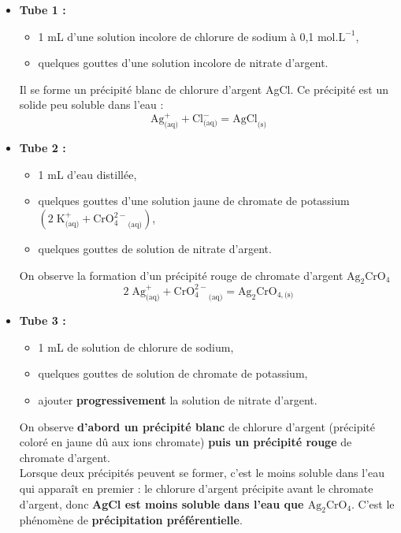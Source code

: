 \documentclass[11pt,a4paper]{report}
\begin{document}
\begin{itemize}
	\item \textbf{Tube 1 :}
		\begin{itemize}
			\item 1 mL d'une solution incolore de chlorure de sodium à 0,1 mol.$\text{L}^{-1}$,
			\item quelques gouttes d'une solution incolore de nitrate d'argent.
		\end{itemize}		 
		Il se forme un précipité blanc de chlorure d'argent AgCl. Ce précipité est un solide peu 				soluble dans l'eau :
		\begin{equation}
			\boxed{\text{Ag}^+_\text{(aq)} + \text{Cl}^-_\text{(aq)} = \text{AgCl}_\text{(s)}}
		\end{equation}
		
	\item \textbf{Tube 2 :}
		\begin{itemize}
			\item 1 mL d’eau distillée,
			\item quelques gouttes d'une solution jaune de 
			chromate de potassium $(2\;\text{K}^+_\text{(aq)}+{\text{CrO}_4^{2-}}_\text{(aq)})$,
			\item quelques gouttes de solution de nitrate d'argent.	
		\end{itemize}
		On observe la formation d'un précipité rouge de chromate d'argent $\text{Ag}_2\text{CrO}_4$
		\begin{equation}
			\boxed{2\;\text{Ag}^+_\text{(aq)} + {\text{CrO}_4^{2-}}_\text{(aq)} 
			= \text{Ag}_2\text{CrO}_{4,\text{(s)}}}
		\end{equation}
		
	\item \textbf{Tube 3 :}
		\begin{itemize}
			\item 1 mL de solution de chlorure de sodium,
			\item quelques gouttes de solution de chromate de potassium,
			\item ajouter \textbf{progressivement} la solution de nitrate d’argent.
		\end{itemize}
		On observe \textbf{d'abord un précipité blanc} de chlorure d'argent (précipité coloré en 			jaune dû aux ions chromate) \textbf{puis un précipité rouge} de chromate d'argent.\\
	
	 	Lorsque deux précipités peuvent se former, c'est le moins soluble dans l'eau qui apparaît 			en premier : le chlorure d'argent précipite avant le chromate d'argent, donc \textbf{AgCl 			est moins soluble dans l'eau que $\text{Ag}_2\text{CrO}_4$}. C'est le phénomène de 					\textbf{précipitation préférentielle}.
\end{itemize}
\end{document}
